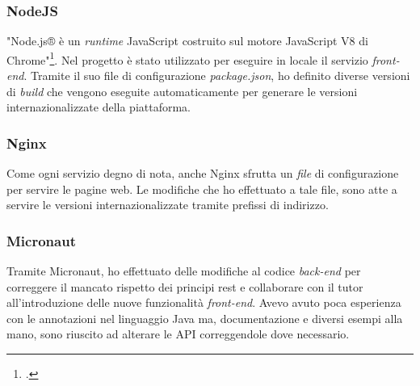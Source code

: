 \subsubsection{NodeJS}
"Node.js® è un \textit{runtime} JavaScript costruito sul motore JavaScript V8 di Chrome"\footcite{site:nodeJS}. Nel progetto è stato utilizzato per eseguire in locale il servizio \textit{front-end}. Tramite il suo file di configurazione \emph{package.json}, ho definito diverse versioni di \textit{build} che vengono eseguite automaticamente per generare le versioni internazionalizzate della piattaforma.
\subsubsection{Nginx}
Come ogni servizio degno di nota, anche Nginx sfrutta un \textit{file} di configurazione per servire le pagine web. Le modifiche che ho effettuato a tale file, sono atte a servire le versioni internazionalizzate tramite prefissi di indirizzo.
\subsubsection{Micronaut}
Tramite Micronaut, ho effettuato delle modifiche al codice \textit{back-end} per correggere il mancato rispetto dei principi \acrshort{rest} e collaborare con il tutor all'introduzione delle nuove funzionalità \textit{front-end}. Avevo avuto poca esperienza con le annotazioni nel linguaggio Java ma, documentazione e diversi esempi alla mano, sono riuscito ad alterare le API correggendole dove necessario.

